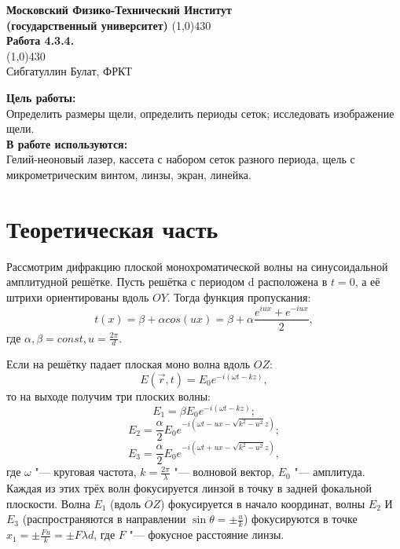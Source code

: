 \documentclass[a4paper, 12pt]{article}%
\begin{document}
\begin{titlepage}

\begin{center}
\large\textbf{Московский Физико-Технический Институт}\\
\large\textbf{(государственный университет)}
\vfill
\line(1,0){430}\\[1mm]
\huge\textbf{Работа 4.3.4.}\\
\line(1,0){430}\\[1mm]
\vfill
\large Сибгатуллин Булат, ФРКТ\\
\end{center}

\end{titlepage}
\noindent \textbf{Цель работы:} \\
\indent Определить размеры щели, определить периоды сеток; исследовать изображение щели.\\
\noindent \textbf{В работе используются:} \\
\indent Гелий-неоновый лазер, кассета с набором сеток разного периода, щель с микрометрическим винтом, линзы, экран, линейка.

\section*{Теоретическая часть}
Рассмотрим дифракцию плоской монохроматической волны на синусоидальной амплитудной решётке. Пусть решётка с периодом d расположена в $t = 0$, а её штрихи ориентированы вдоль $OY$. Тогда функция пропускания:
\[
	t(x) = \beta  + \alpha cos(ux) = \beta + \alpha \frac{e^{iux} + e^{-iux}}{2},
\]
где $\alpha, \beta = const, u = \frac{2 \pi}{d}$.

Если на решётку падает плоская моно волна вдоль $OZ$:
\[
	E(\vec r, t) = E_0 e^{-i(\omega t - kz)},
\]
то на выходе получим три плоских волны:
\[
	E_1 = \beta E_0 e^{-i (\omega t - kz)};
\]
\[
	E_2 = \frac{\alpha}{2} E_0 e^{-i (\omega t - ux - \sqrt{k^2 - u^2}z)};
\]
\[
	E_3 = \frac{\alpha}{2} E_0 e^{-i (\omega t + ux - \sqrt{k^2 - u^2}z)},
\]
где $\omega$ "--- круговая частота, $k = \frac{2 \pi}{\lambda}$ "--- волновой вектор, $E_0$ "--- амплитуда.
Каждая из этих трёх волн фокусируется линзой в точку в задней фокальной плоскости. Волна $E_1$ (вдоль $OZ$) фокусируется в начало координат, волны $E_2$ И $E_3$ (распространяются в направлении $\sin \theta = \pm \frac{u}{k}$) фокусируются в точке $x_1 = \pm \frac{Fu}{k} = \pm {F \lambda}{d}$, где $F$ "--- фокусное расстояние линзы.
\end{document}
